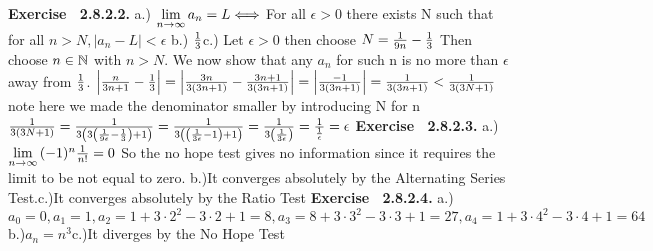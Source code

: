  {\noindent \protect \bf  Exercise ~2.8.2.2.} a.) $\protect \qopname  \relax m{lim}\limits _{n \to \infty }{a_n} = L \DOTSB \Leftarrow \protect \joinrel  \Rightarrow $ For all $\epsilon >0$ there exists N such that for all $n>N, |a_n-L| < \epsilon $ \protect \newline  b.) $\protect \frac  {1}{3}$\protect \newline  c.) Let $\epsilon >0$ then choose $N=\protect \frac  {1}{9n}-\protect \frac  {1}{3}$ Then choose $n \in \protect \mathbb  {N}$ with $n>N$. We now show that any $a_n$ for such n is no more than $\epsilon $ away from $\protect \frac  {1}{3}$. \protect \newline  $\left | \protect \frac  {n}{3n+1} - \protect \frac  {1}{3} \right |=\left | \protect \frac  {3n}{3(3n+1)} - \protect \frac  {3n+1}{3(3n+1)} \right |=\left | \protect \frac  {-1}{3(3n+1)} \right |= \protect \frac  {1}{3(3n+1)}<\protect \frac  {1}{3(3N+1)}$ \protect \newline  note here we made the denominator smaller by introducing N for n\protect \newline  $\protect \frac  {1}{3(3N+1)}=\protect \frac  {1}{3\left (3\left (\protect \frac  {1}{9 \epsilon }-\protect \frac  {1}{3} \right )+1\right )}=\protect \frac  {1}{3\left (\left (\protect \frac  {1}{3 \epsilon }-1 \right )+1\right )}=\protect \frac  {1}{3\left (\protect \frac  {1}{3 \epsilon } \right )}=\protect \frac  {1}{\protect \frac  {1}{\epsilon }}=\epsilon $  \protect \newline  \protect \newline  
 {\noindent \protect \bf  Exercise ~2.8.2.3.} a.)$\protect \qopname  \relax m{lim}\limits _{n \to \infty }{(-1)^n \protect \frac  {1}{n!}} = 0$ So the no hope test gives no information since it requires the limit to be not equal to zero. \protect \newline  b.)It converges absolutely by the Alternating Series Test.\protect \newline  c.)It converges absolutely by the Ratio Test  \protect \newline  \protect \newline  
 {\noindent \protect \bf  Exercise ~2.8.2.4.} a.)$a_0 = 0, a_1=1, a_2=1+3\cdot 2^2-3\cdot 2+1 = 8, a_3=8+3\cdot 3^2-3\cdot 3+1 = 27, a_4=1+3\cdot 4^2-3\cdot 4+1 = 64 $\protect \newline  b.)$a_n = n^3$\protect \newline  c.)It diverges by the No Hope Test  \protect \newline  \protect \newline  
